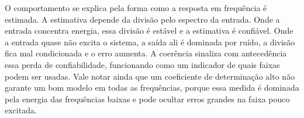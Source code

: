O comportamento se explica pela forma como a resposta em frequência é estimada. A
estimativa depende da divisão pelo espectro da entrada. Onde a entrada concentra
energia, essa divisão é estável e a estimativa é confiável. Onde a entrada quase não
excita o sistema, a saída ali é dominada por ruído, a divisão fica mal condicionada e
o erro aumenta. A coerência sinaliza com antecedência essa perda de confiabilidade,
funcionando como um indicador de quais faixas podem ser usadas. Vale notar ainda que
um coeficiente de determinação alto não garante um bom modelo em todas as
frequências, porque essa medida é dominada pela energia das frequências baixas e pode
ocultar erros grandes na faixa pouco excitada.
